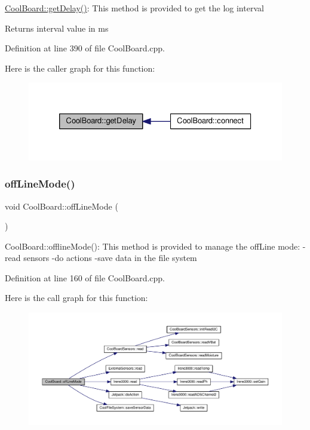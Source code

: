 \hyperlink{class_cool_board_a12c3b5fa0ee6cc2c7d397abfc78f0f43}{Cool\+Board\+::get\+Delay()}\+: This method is provided to get the log interval \begin{DoxyReturn}{Returns}
interval value in ms 
\end{DoxyReturn}


Definition at line 390 of file Cool\+Board.\+cpp.

Here is the caller graph for this function\+:\nopagebreak
\begin{figure}[H]
\begin{center}
\leavevmode
\includegraphics[width=326pt]{class_cool_board_a12c3b5fa0ee6cc2c7d397abfc78f0f43_icgraph}
\end{center}
\end{figure}
\mbox{\label{class_cool_board_ae6b5e1274d760462290192acea4adca8}} 
\subsubsection{\texorpdfstring{off\+Line\+Mode()}{offLineMode()}}
{\footnotesize\ttfamily void Cool\+Board\+::off\+Line\+Mode (\begin{DoxyParamCaption}{ }\end{DoxyParamCaption})}

Cool\+Board\+::offline\+Mode()\+: This method is provided to manage the off\+Line mode\+: -\/read sensors -\/do actions -\/save data in the file system 

Definition at line 160 of file Cool\+Board.\+cpp.

Here is the call graph for this function\+:\nopagebreak
\begin{figure}[H]
\begin{center}
\leavevmode
\includegraphics[width=350pt]{class_cool_board_ae6b5e1274d760462290192acea4adca8_cgraph}
\end{center}
\end{figure}
\mbox{\label{class_cool_board_aa0bbc4bc605e35618d18e68795c61363}} 
